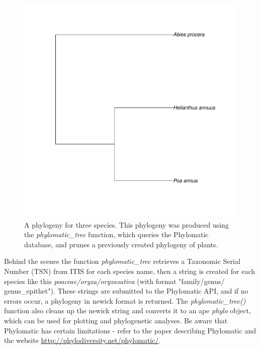\begin{sloppypar}
\begin{knitrout}
\small

\color{fgcolor}
\begin{kframe}
\begin{alltt}
 \hlkwb{<-} \hlstd{(}\hlstd{,} \hlstd{,} \hlstd{)}
 \hlkwb{<-} \hlstd{(} 
\hlopt{$} \hlkwb{<-} \hlopt{$}
  \hlstd{=} \hlstd{)}
\end{alltt}
\end{kframe}
\end{knitrout}

\begin{figure}[!ht]
\begin{center}
\includegraphics[width=.7\textwidth]{chapters/taxize/phylogeny.pdf}
\end{center}
\caption[A phylogeny for three species produced using the \emph{phylomatic\_tree} function.]{
{A phylogeny for three species. This phylogeny was produced using the \emph{phylomatic\_tree} function, which queries the Phylomatic database, and prunes a previously created phylogeny of plants.}
}
\label{fig:taxize:phylomatic}
\end{figure}

Behind the scenes the function \emph{phylomatic\_tree} retrieves a Taxonomic Serial Number (TSN) from ITIS for each species name, then a string is created for each species like this \emph{poaceae/oryza/oryzasativa} (with format "family/genus/\\genus\_epithet"). 
These strings are submitted to the Phylomatic API, and if no errors occur, a phylogeny in newick format is returned. 
The \emph{phylomatic\_tree()} function also cleans up the newick string and converts it to an ape \emph{phylo} object, which can be used for plotting and phylogenetic analyses. 
Be aware that Phylomatic has certain limitations - refer to the paper describing Phylomatic \citep{webb2005} and the website \url{http://phylodiversity.net/phylomatic/}.




\end{sloppypar}
